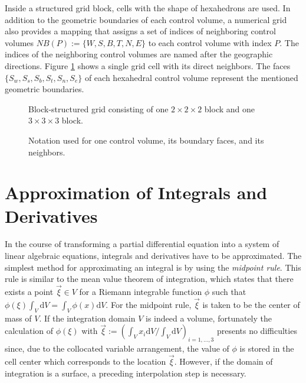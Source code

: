 Inside a structured grid block, cells with the shape of hexahedrons are used. In addition to the geometric boundaries of each control volume, a numerical grid also provides a mapping that assigns a set of indices of neighboring control volumes \(NB(P):=\{W,S,B,T,N,E\}\) to each control volume with index \(P\).  The indices of the neighboring control volumes are named after the geographic directions. Figure \ref{fig:not} shows a single grid cell with its direct neighbors. The faces \(\{S_w,S_s,S_b,S_t,S_n,S_e\}\) of each hexahedral control volume represent the mentioned geometric boundaries. 

\begin{figure}[h]
  \begin{minipage}[1\width]{0.5\textwidth}%
    
    \centering{}
  \caption{Block-structured grid consisting of one $2\times2\times2$ block and one $3\times3\times3$ block.}
  \label{fig:blockstruc}
  \end{minipage}
  \hfil
  \begin{minipage}[1\width]{0.4\textwidth}%
    \centering{}
    
  \caption{Notation used for one control volume, its boundary faces, and its neighbors.}
  \label{fig:not}
  \end{minipage}
 \end{figure}

\section{Approximation of Integrals and Derivatives}
\label{sec:approxintegralderivative}

In the course of transforming a partial differential equation into a system of linear algebraic equations, integrals and derivatives have to be approximated. The simplest method for approximating an integral is by using the \emph{midpoint rule}. This rule is similar to the mean value theorem of integration, which states that there exists a point \(\vec{\xi} \in V\) for a Riemann integrable function \(\phi\) such that \(\textstyle \phi(\xi) \int_V \mathrm{d}V = \int_V \phi(x) \mathrm{d}V\). For the midpoint rule, \(\vec{\xi}\) is taken to be the center of mass of \(V\). If the integration domain \(V\) is indeed a volume, fortunately the calculation of \(\phi(\mathbb{\xi})\) with \(\textstyle \vec{\xi} := \left({ \int_V x_i \mathrm{d}V }/{ \int_V \mathrm{d}V } \right)_{i = 1,\dots,3}\) presents no difficulties since, due to the collocated variable arrangement, the value of \(\phi\) is stored in the cell center which corresponds to the location \(\vec{\xi}\). However, if the domain of integration is a surface, a preceding interpolation step is necessary.

